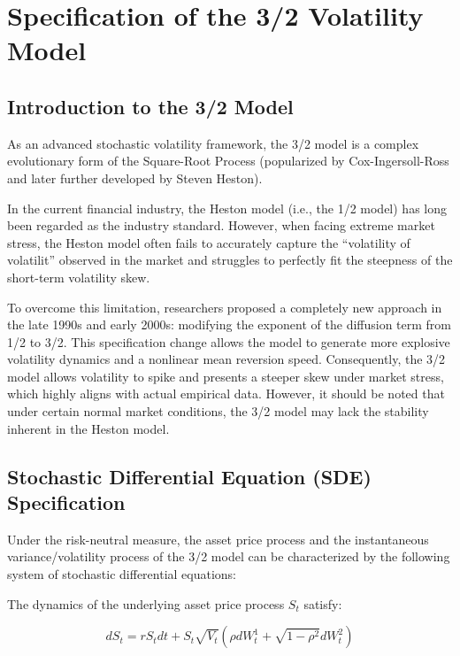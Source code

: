 \chapter{Specification of the 3/2 Volatility Model}
\label{chap:model}

\section{Introduction to the 3/2 Model}
\label{sec:model_setup}

As an advanced stochastic volatility framework, the 3/2 model is a complex evolutionary form of the Square-Root Process (popularized by Cox-Ingersoll-Ross and later further developed by Steven Heston).

In the current financial industry, the Heston model (i.e., the 1/2 model) has long been regarded as the industry standard. However, when facing extreme market stress, the Heston model often fails to accurately capture the ``volatility of volatilit'' observed in the market and struggles to perfectly fit the steepness of the short-term volatility skew.

To overcome this limitation, researchers proposed a completely new approach in the late 1990s and early 2000s: modifying the exponent of the diffusion term from 1/2 to 3/2. This specification change allows the model to generate more explosive volatility dynamics and a nonlinear mean reversion speed. Consequently, the 3/2 model allows volatility to spike and presents a steeper skew under market stress, which highly aligns with actual empirical data. However, it should be noted that under certain normal market conditions, the 3/2 model may lack the stability inherent in the Heston model.

\section{Stochastic Differential Equation (SDE) Specification}

Under the risk-neutral measure, the asset price process and the instantaneous variance/volatility process of the 3/2 model can be characterized by the following system of stochastic differential equations:

The dynamics of the underlying asset price process $S_t$ satisfy:

\begin{equation}
    dS_t = r S_t dt + S_t \sqrt{V_t} (\rho dW_t^1 + \sqrt{1-\rho^2} dW_t^2)
    \label{eq:underlyingProcess}
\end{equation}

